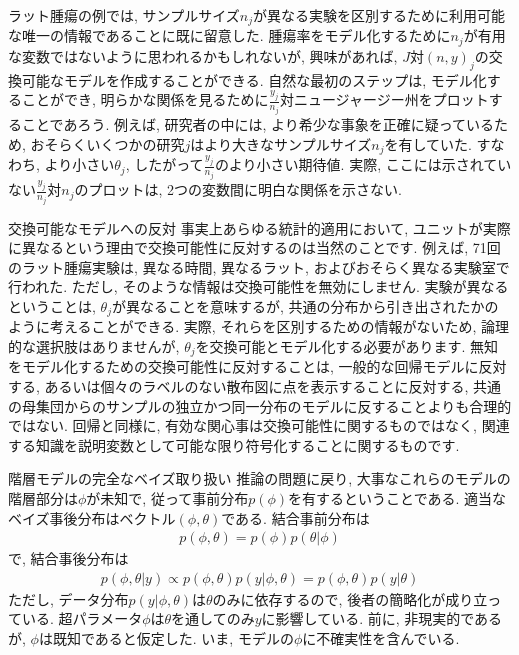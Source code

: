 \documentclass[10pt,dvipdfmx,a4]{beamer}
\newcommand{\eq}[1]{\begin{align}#1\end{align}}
\newcommand{\eqn}[1]{\begin{align*}#1\end{align*}}
\begin{document}

\begin{frame}
ラット腫瘍の例では, サンプルサイズ$n_j$が異なる実験を区別するために利用可能な唯一の情報であることに既に留意した.
腫瘍率をモデル化するために$n_j$が有用な変数ではないように思われるかもしれないが, 興味があれば, $J$対$(n,y)_j$の交換可能なモデルを作成することができる.
自然な最初のステップは, モデル化することができ, 明らかな関係を見るために$\tfrac{y_j}{n_j}$対ニュージャージー州をプロットすることであろう.
例えば, 研究者の中には, より希少な事象を正確に疑っているため, おそらくいくつかの研究$j$はより大きなサンプルサイズ$n_j$を有していた.
すなわち, より小さい$\theta_j$, したがって$\frac{y_j}{n_j}$のより小さい期待値.
実際, ここには示されていない$\frac{y_j}{n_j}$対$n_j$のプロットは, 2つの変数間に明白な関係を示さない.
\end{frame}


\begin{frame}{交換可能なモデルへの反対}
事実上あらゆる統計的適用において, ユニットが実際に異なるという理由で交換可能性に反対するのは当然のことです.
例えば, 71回のラット腫瘍実験は, 異なる時間, 異なるラット, およびおそらく異なる実験室で行われた.
ただし, そのような情報は交換可能性を無効にしません.
実験が異なるということは, $\theta_j$が異なることを意味するが, 共通の分布から引き出されたかのように考えることができる.
実際, それらを区別するための情報がないため, 論理的な選択肢はありませんが, $\theta_j$を交換可能とモデル化する必要があります.
無知をモデル化するための交換可能性に反対することは, 一般的な回帰モデルに反対する, あるいは個々のラベルのない散布図に点を表示することに反対する, 共通の母集団からのサンプルの独立かつ同一分布のモデルに反することよりも合理的ではない.
回帰と同様に, 有効な関心事は交換可能性に関するものではなく, 関連する知識を説明変数として可能な限り符号化することに関するものです.
\end{frame}


\begin{frame}{階層モデルの完全なベイズ取り扱い}
推論の問題に戻り, 大事なこれらのモデルの階層部分は$\phi$が未知で, 従って事前分布$p(\phi)$を有するということである.
適当なベイズ事後分布はベクトル$(\phi,\theta)$である.
結合事前分布は
\eqn{p(\phi,\theta)=p(\phi)p(\theta|\phi)}
で, 結合事後分布は
\eq{p(\phi,\theta|y)\propto p(\phi,\theta)p(y|\phi,\theta)=p(\phi,\theta)p(y|\theta)}
ただし, データ分布$p(y|\phi,\theta)$は$\theta$のみに依存するので, 後者の簡略化が成り立っている.
超パラメータ$\phi$は$\theta$を通してのみ$y$に影響している.
前に, 非現実的であるが, $\phi$は既知であると仮定した.
いま, モデルの$\phi$に不確実性を含んでいる.
\end{frame}
\end{document}
